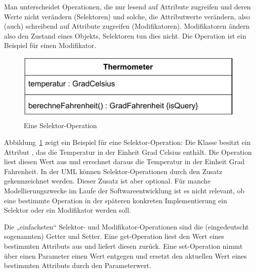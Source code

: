 \vspace{2.5mm} %

Man
unterscheidet Operationen, die nur lesend auf Attribute zugreifen und deren Werte nicht verändern (Selektoren) und solche, die Attributwerte verändern, also (auch) schreibend auf Attribute zugreifen (Modifikatoren). Modifikatoren ändern also den Zustand eines Objekts, Selektoren tun dies nicht. Die Operation  ist ein Beispiel für einen Modifikator. 

\pagebreak %

\vspace*{\baselineskip} %

\begin{figure}[h!]
	\centering
	\includegraphics[scale=1.0]{Bilder/Kapitel-8/klasse_thermometer.pdf}
	\caption{Eine Selektor-Operation}
	\label{fig:klasse_thermometer}
\end{figure}

\vspace{\baselineskip} %

Abbildung~\ref{fig:klasse_thermometer} zeigt ein Beispiel für eine Selektor-Operation: Die Klasse  besitzt ein Attribut , das die Temperatur in der Einheit Grad Celsius enthält. Die Operation  liest diesen Wert aus und errechnet daraus die Temperatur in der Einheit Grad Fahrenheit. In der UML können Selektor-Operationen durch den Zusatz  gekennzeichnet werden. Dieser Zusatz ist aber optional. Für manche Modellierungszwecke im Laufe der Softwareentwicklung ist es nicht relevant, ob eine bestimmte Operation in der späteren konkreten Implementierung ein Selektor oder ein Modifikator werden soll.

\vspace{2mm} %

Die
„einfachsten“ Selektor- und Modifikator-Operationen sind die (eingedeutscht sogenannten) Getter und Setter. Eine get-Operation liest den Wert eines bestimmten Attributs aus und liefert diesen zurück. Eine set-Operation nimmt über einen Parameter einen Wert entgegen und ersetzt den aktuellen Wert eines bestimmten Attributs durch den Parameterwert. 

